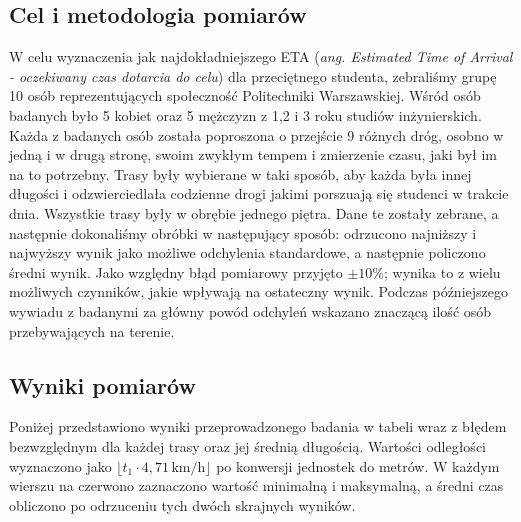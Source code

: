 \documentclass[14pt,a4paper]{extarticle}
\begin{document}
\subsection{Cel i metodologia pomiarów}
W celu wyznaczenia jak najdokładniejszego ETA (\textit{ang. Estimated Time of Arrival - oczekiwany czas dotarcia do celu}) dla przeciętnego studenta, zebraliśmy grupę 10 osób reprezentujących społeczność Politechniki Warszawskiej. Wśród osób badanych było 5 kobiet oraz 5 mężczyzn z 1,2 i 3 roku studiów inżynierskich. Każda z badanych osób została poproszona o przejście 9 różnych dróg, osobno w jedną i w drugą stronę, swoim zwykłym tempem i zmierzenie czasu, jaki był im na to potrzebny. Trasy były wybierane w taki sposób, aby każda była innej długości i odzwierciedlała codzienne drogi jakimi porszuają się studenci w trakcie dnia. Wszystkie trasy były w obrębie jednego piętra. Dane te zostały zebrane, a następnie dokonaliśmy obróbki w następujący sposób: odrzucono najniższy i najwyższy wynik jako możliwe odchylenia standardowe, a następnie policzono średni wynik. Jako względny błąd pomiarowy przyjęto $\pm 10\%$; wynika to z wielu możliwych czynników, jakie wpływają na ostateczny wynik. Podczas późniejszego wywiadu z badanymi za główny powód odchyleń wskazano znaczącą ilość osób przebywających na terenie.

\subsection{Wyniki pomiarów}
Poniżej przedstawiono wyniki przeprowadzonego badania w tabeli wraz z błędem bezwzględnym dla każdej trasy oraz jej średnią długością. Wartości odległości wyznaczono jako $\lfloor t_1 \cdot 4{,}71 \,\text{km/h} \rfloor$ po konwersji jednostek do metrów. W każdym wierszu na czerwono zaznaczono wartość minimalną i maksymalną, a średni czas obliczono po odrzuceniu tych dwóch skrajnych wyników.
\end{document}
